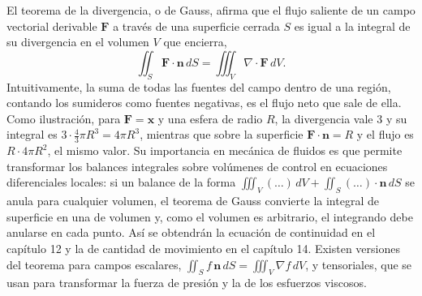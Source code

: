 \documentclass[10pt,openany]{book}
\begin{document}
El teorema de la divergencia, o de Gauss, afirma que el flujo saliente de un campo vectorial derivable \(\mathbf{F}\) a través de una superficie cerrada \(S\) es igual a la integral de su divergencia en el volumen \(V\) que encierra,
\begin{equation}
\iint_S \mathbf{F}\cdot\mathbf{n}\,dS = \iiint_V \nabla\cdot\mathbf{F}\,dV. \label{eq:c11-gauss}
\end{equation}
Intuitivamente, la suma de todas las fuentes del campo dentro de una región, contando los sumideros como fuentes negativas, es el flujo neto que sale de ella. Como ilustración, para \(\mathbf{F} = \mathbf{x}\) y una esfera de radio \(R\), la divergencia vale 3 y su integral es \(3\cdot\tfrac43\pi R^{3} = 4\pi R^{3}\), mientras que sobre la superficie \(\mathbf{F}\cdot\mathbf{n} = R\) y el flujo es \(R\cdot 4\pi R^{2}\), el mismo valor. Su importancia en mecánica de fluidos es que permite transformar los balances integrales sobre volúmenes de control en ecuaciones diferenciales locales: si un balance de la forma \(\iiint_V (\ldots)\,dV + \iint_S (\ldots)\cdot\mathbf{n}\,dS\) se anula para cualquier volumen, el teorema de Gauss convierte la integral de superficie en una de volumen y, como el volumen es arbitrario, el integrando debe anularse en cada punto. Así se obtendrán la ecuación de continuidad en el capítulo 12 y la de cantidad de movimiento en el capítulo 14. Existen versiones del teorema para campos escalares, \(\iint_S f\,\mathbf{n}\,dS = \iiint_V \nabla f\,dV\), y tensoriales, que se usan para transformar la fuerza de presión y la de los esfuerzos viscosos.
\end{document}
